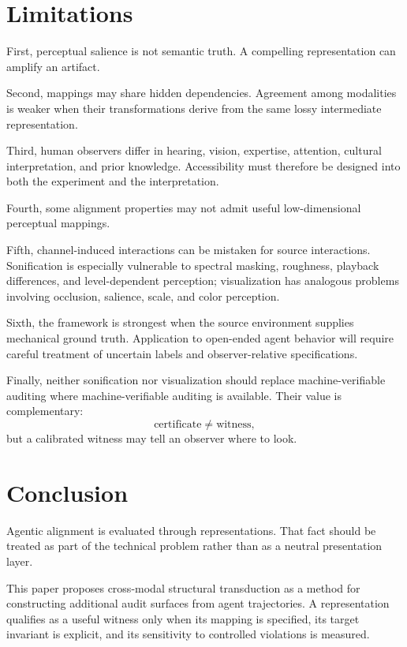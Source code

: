 \documentclass[11pt]{article}
\begin{document}
\section{Limitations}
First, perceptual salience is not semantic truth. A compelling representation can amplify an artifact.

Second, mappings may share hidden dependencies. Agreement among modalities is weaker when their transformations derive from the same lossy intermediate representation.

Third, human observers differ in hearing, vision, expertise, attention, cultural interpretation, and prior knowledge. Accessibility must therefore be designed into both the experiment and the interpretation.

Fourth, some alignment properties may not admit useful low-dimensional perceptual mappings.

Fifth, channel-induced interactions can be mistaken for source interactions. Sonification is especially vulnerable to spectral masking, roughness, playback differences, and level-dependent perception; visualization has analogous problems involving occlusion, salience, scale, and color perception.

Sixth, the framework is strongest when the source environment supplies mechanical ground truth. Application to open-ended agent behavior will require careful treatment of uncertain labels and observer-relative specifications.

Finally, neither sonification nor visualization should replace machine-verifiable auditing where machine-verifiable auditing is available. Their value is complementary:
\begin{equation}
\text{certificate}\neq\text{witness},
\end{equation}
but a calibrated witness may tell an observer where to look.

\section{Conclusion}
Agentic alignment is evaluated through representations. That fact should be treated as part of the technical problem rather than as a neutral presentation layer.

This paper proposes cross-modal structural transduction as a method for constructing additional audit surfaces from agent trajectories. A representation qualifies as a useful witness only when its mapping is specified, its target invariant is explicit, and its sensitivity to controlled violations is measured.
\end{document}
